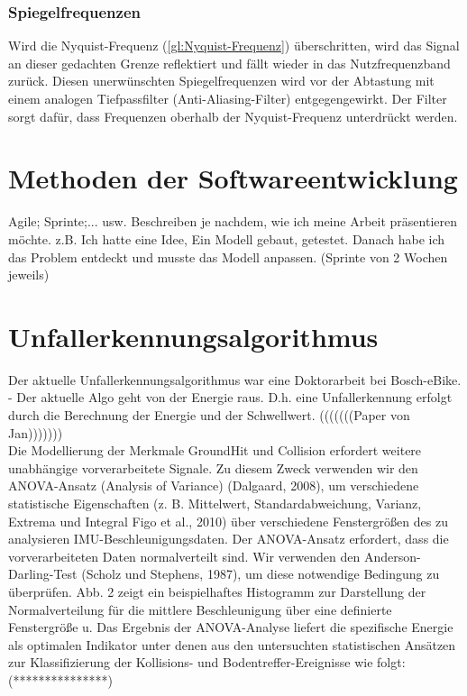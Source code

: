 \subsubsection{Spiegelfrequenzen}
Wird die Nyquist-Frequenz (\autoref{gl:Nyquist-Frequenz}) überschritten, wird das Signal an dieser gedachten Grenze reflektiert und fällt wieder in das Nutzfrequenzband zurück. Diesen unerwünschten Spiegelfrequenzen wird vor der Abtastung mit einem analogen Tiefpassfilter (Anti-Aliasing-Filter) entgegengewirkt. Der Filter sorgt dafür, dass Frequenzen oberhalb der Nyquist-Frequenz unterdrückt werden.






%
%
%
%
%
%
%



\section{Methoden der Softwareentwicklung}
Agile; Sprinte;... usw.
Beschreiben je nachdem, wie ich meine Arbeit präsentieren möchte.
z.B. Ich hatte eine Idee,  Ein Modell gebaut, getestet. Danach habe ich das Problem entdeckt und musste das Modell anpassen. (Sprinte von 2 Wochen jeweils)

%
%
%
%
%
%
%
\section{Unfallerkennungsalgorithmus} %
%
%
%
%
Der aktuelle Unfallerkennungsalgorithmus war eine Doktorarbeit bei Bosch-eBike. \\

- Der aktuelle Algo geht von der Energie raus. D.h. eine Unfallerkennung erfolgt durch die Berechnung der Energie und der Schwellwert. (((((((Paper von Jan)))))))\\

Die Modellierung der Merkmale GroundHit und Collision erfordert weitere unabhängige vorverarbeitete Signale. Zu diesem Zweck verwenden wir den ANOVA-Ansatz (Analysis of Variance) (Dalgaard, 2008), um verschiedene statistische Eigenschaften (z. B. Mittelwert, Standardabweichung, Varianz, Extrema und Integral Figo et al., 2010) über verschiedene Fenstergrößen des zu analysieren IMU-Beschleunigungsdaten. Der ANOVA-Ansatz erfordert, dass die vorverarbeiteten Daten normalverteilt sind. Wir verwenden den Anderson-Darling-Test (Scholz und Stephens, 1987), um diese notwendige Bedingung zu überprüfen. Abb. 2 zeigt ein beispielhaftes Histogramm zur Darstellung der Normalverteilung für die mittlere Beschleunigung über eine definierte Fenstergröße u. Das Ergebnis der ANOVA-Analyse liefert die spezifische Energie als optimalen Indikator unter denen aus den untersuchten statistischen Ansätzen zur Klassifizierung der Kollisions- und Bodentreffer-Ereignisse wie folgt: (***************) \\ \cite{Schneeclassification2021} %

